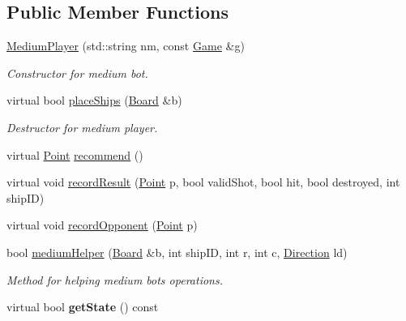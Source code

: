 \subsection*{Public Member Functions}
\begin{DoxyCompactItemize}
\item 
\mbox{\label{class_medium_player_a76923857c4fa54d192ed4644c72bce2d}} 
\mbox{\hyperlink{class_medium_player_a76923857c4fa54d192ed4644c72bce2d}{Medium\+Player}} (std\+::string nm, const \mbox{\hyperlink{class_game}{Game}} \&g)
\begin{DoxyCompactList}\small\item\em Constructor for medium bot. \end{DoxyCompactList}\item 
virtual bool \mbox{\hyperlink{class_medium_player_ac4d4748e2c27a2a51033bbce9f12de26}{place\+Ships}} (\mbox{\hyperlink{class_board}{Board}} \&b)
\begin{DoxyCompactList}\small\item\em Destructor for medium player. \end{DoxyCompactList}\item 
virtual \mbox{\hyperlink{class_point}{Point}} \mbox{\hyperlink{class_medium_player_a2e99d57f30f3f7f929840b8cda16527d}{recommend}} ()
\item 
virtual void \mbox{\hyperlink{class_medium_player_aeadd8498cba5c447afbb5a0eb7408285}{record\+Result}} (\mbox{\hyperlink{class_point}{Point}} p, bool valid\+Shot, bool hit, bool destroyed, int ship\+ID)
\item 
virtual void \mbox{\hyperlink{class_medium_player_a6183d4a8fe3d68419afcfa9e33cd5928}{record\+Opponent}} (\mbox{\hyperlink{class_point}{Point}} p)
\item 
bool \mbox{\hyperlink{class_medium_player_a502c34f56cfe60def6d01de7c4f300e2}{medium\+Helper}} (\mbox{\hyperlink{class_board}{Board}} \&b, int ship\+ID, int r, int c, \mbox{\hyperlink{_globals_8h_a224b9163917ac32fc95a60d8c1eec3aa}{Direction}} ld)
\begin{DoxyCompactList}\small\item\em Method for helping medium bot\textquotesingle{}s operations. \end{DoxyCompactList}\item 
\mbox{\label{class_medium_player_a90a8cd5feeaa759043af77afe266907c}} 
virtual bool {\bfseries get\+State} () const
\item 

\end{DoxyCompactItemize}
